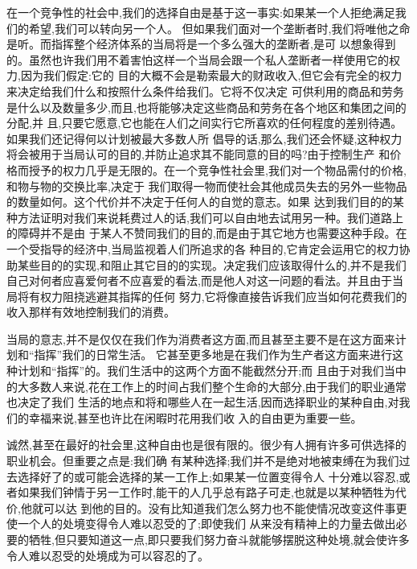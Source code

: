 ﻿\documentclass[12pt]{article}
\begin{document}
在一个竞争性的社会中,我们的选择自由是基于这一事实:如果某一个人拒绝满足我们的希望,我们可以转向另一个人。
但如果我们面对一个垄断者时,我们将唯他之命是听。而指挥整个经济体系的当局将是一个多么强大的垄断者,是可
以想象得到的。虽然也许我们用不着害怕这样一个当局会跟一个私人垄断者一样使用它的权力,因为我们假定:它的
目的大概不会是勒索最大的财政收入,但它会有完全的权力来决定给我们什么和按照什么条件给我们。它将不仅决定
可供利用的商品和劳务是什么以及数量多少,而且,也将能够决定这些商品和劳务在各个地区和集团之间的分配,并
且,只要它愿意,它也能在人们之间实行它所喜欢的任何程度的差别待遇。如果我们还记得何以计划被最大多数人所
倡导的话,那么,我们还会怀疑,这种权力将会被用于当局认可的目的,并防止追求其不能同意的目的吗?由于控制生产
和价格而授予的权力几乎是无限的。在一个竞争性社会里,我们对一个物品需付的价格,和物与物的交换比率,决定于
我们取得一物而使社会其他成员失去的另外一些物品的数量如何。这个代价并不决定于任何人的自觉的意志。如果
达到我们目的的某种方法证明对我们来说耗费过人的话,我们可以自由地去试用另一种。我们道路上的障碍并不是由
于某人不赞同我们的目的,而是由于其它地方也需要这种手段。在一个受指导的经济中,当局监视着人们所追求的各
种目的,它肯定会运用它的权力协助某些目的的实现,和阻止其它目的的实现。决定我们应该取得什么的,并不是我们
自己对何者应喜爱何者不应喜爱的看法,而是他人对这一问题的看法。并且由于当局将有权力阻挠逃避其指挥的任何
努力,它将像直接告诉我们应当如何花费我们的收入那样有效地控制我们的消费。

当局的意志,并不是仅仅在我们作为消费者这方面,而且甚至主要不是在这方面来计划和``指挥''我们的日常生活。
它甚至更多地是在我们作为生产者这方面来进行这种计划和``指挥''的。我们生活中的这两个方面不能截然分开;而
且由于对我们当中的大多数人来说,花在工作上的时间占我们整个生命的大部分,由于我们的职业通常也决定了我们
生活的地点和将和哪些人在一起生活,因而选择职业的某种自由,对我们的幸福来说,甚至也许比在闲暇时花用我们收
入的自由更为重要一些。

诚然,甚至在最好的社会里,这种自由也是很有限的。很少有人拥有许多可供选择的职业机会。但重要之点是:我们确
有某种选择;我们并不是绝对地被束缚在为我们过去选择好了的或可能会选择的某一工作上;如果某一位置变得令人
十分难以容忍,或者如果我们钟情于另一工作时,能干的人几乎总有路子可走,也就是以某种牺牲为代价,他就可以达
到他的目的。没有比知道我们怎么努力也不能使情况改变这件事更使一个人的处境变得令人难以忍受的了;即使我们
从来没有精神上的力量去做出必要的牺牲,但只要知道这一点,即只要我们努力奋斗就能够摆脱这种处境,就会使许多
令人难以忍受的处境成为可以容忍的了。
\end{document}
